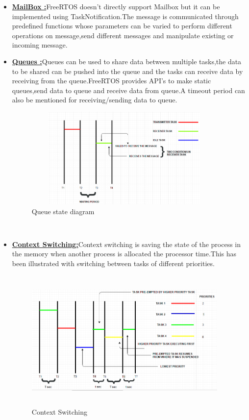 \documentclass[a4paper,12pt,oneside]{book}
\begin{document}
\begin{itemize}
\\
\item \textbf{\href{https://github.com/eYSIP-2016/RTOS_LPC2148/tree/master/Codes/MailBox}{MailBox :}}FreeRTOS doesn't directly support Mailbox but it can be implemented using TaskNotification.The message is communicated through predefined functions whose parameters can be varied to perform different operations on message,send different messages and manipulate existing or incoming message.
\\
\item \textbf{\href{https://github.com/eYSIP-2016/RTOS_LPC2148/tree/master/Codes/Queue}{Queues :}}Queues can be used to share data between multiple tasks,the data to be shared can be pushed into the queue and the tasks can receive data by receiving from the queue.FreeRTOS provides API's to make static queues,send data to queue and receive data from queue.A timeout period can also be mentioned for receiving/sending data to queue.
\begin{figure}[h]
\centering
\includegraphics[width=10cm,height=5cm]{QUEUE.PNG}
\caption{Queue state diagram}
\end{figure}

\\
\item \textbf{\href{https://github.com/eYSIP-2016/RTOS_LPC2148/tree/master/Codes/ContextSwitching}{Context Switching:}}Context switching is saving the state of the process in the memory when another process is allocated the processor time.This has been illustrated with switching between tasks of different priorities.
\begin{figure}[h]
\centering
\includegraphics[width=10cm,height=7cm]{CONTEXTSWITCHING.PNG}
\caption{Context Switching}
\end{figure}
\newpage



\end{itemize}
\end{document}

